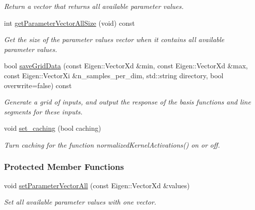 \begin{DoxyCompactItemize}
\begin{DoxyCompactList}\small\item\em Return a vector that returns all available parameter values. \end{DoxyCompactList}\item 
int \hyperlink{classDmpBbo_1_1UnifiedModel_ab24d2485b3b795b516f4844f225100eb}{get\+Parameter\+Vector\+All\+Size} (void) const 
\begin{DoxyCompactList}\small\item\em Get the size of the parameter values vector when it contains all available parameter values. \end{DoxyCompactList}\item 
bool \hyperlink{classDmpBbo_1_1UnifiedModel_a53d95f63de3b49491b1204f45a24ae25}{save\+Grid\+Data} (const Eigen\+::\+Vector\+Xd \&min, const Eigen\+::\+Vector\+Xd \&max, const Eigen\+::\+Vector\+Xi \&n\+\_\+samples\+\_\+per\+\_\+dim, std\+::string directory, bool overwrite=false) const 
\begin{DoxyCompactList}\small\item\em Generate a grid of inputs, and output the response of the basis functions and line segments for these inputs. \end{DoxyCompactList}\item 
void \hyperlink{classDmpBbo_1_1UnifiedModel_a9defb2d398362ff5663a1fde70903651}{set\+\_\+caching} (bool caching)
\begin{DoxyCompactList}\small\item\em Turn caching for the function normalized\+Kernel\+Activations() on or off. \end{DoxyCompactList}\end{DoxyCompactItemize}
\subsubsection*{Protected Member Functions}
\begin{DoxyCompactItemize}
\item 
void \hyperlink{classDmpBbo_1_1UnifiedModel_a9d3c8f22e8237a805af4935a647e5a50}{set\+Parameter\+Vector\+All} (const Eigen\+::\+Vector\+Xd \&values)
\begin{DoxyCompactList}\small\item\em Set all available parameter values with one vector. \end{DoxyCompactList}\end{DoxyCompactItemize}
